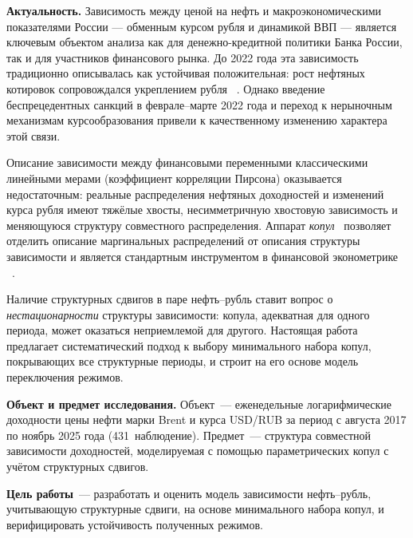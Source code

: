 



\Intro

\textbf{Актуальность.}
Зависимость между ценой на нефть и макроэкономическими показателями России ---
обменным курсом рубля и динамикой ВВП --- является ключевым объектом анализа
как для денежно-кредитной политики Банка России, так и для участников
финансового рынка.
До 2022 года эта зависимость традиционно описывалась как устойчивая
положительная: рост нефтяных котировок сопровождался укреплением рубля
~\autocite{Silvo2017}.
Однако введение беспрецедентных санкций в феврале--марте 2022 года и переход
к нерыночным механизмам курсообразования привели к качественному изменению
характера этой связи.

Описание зависимости между финансовыми переменными классическими
линейными мерами (коэффициент корреляции Пирсона) оказывается
недостаточным: реальные распределения нефтяных доходностей и изменений
курса рубля имеют тяжёлые хвосты, несимметричную хвостовую зависимость
и меняющуюся структуру совместного распределения.
Аппарат \emph{копул}~\autocite{Sklar1959, Nelsen2006} позволяет отделить
описание маргинальных распределений от описания структуры зависимости
и является стандартным инструментом в финансовой эконометрике
~\autocite{Patton2006, Rodriguez2007, Penikas2014}.

Наличие структурных сдвигов в паре нефть--рубль ставит вопрос о
\emph{нестационарности} структуры зависимости: копула, адекватная для
одного периода, может оказаться неприемлемой для другого.
Настоящая работа предлагает систематический подход к выбору минимального
набора копул, покрывающих все структурные периоды, и строит на его основе
модель переключения режимов.

\textbf{Объект и предмет исследования.}
Объект~--- еженедельные логарифмические доходности цены нефти марки Brent
и курса USD/RUB за период с августа 2017 по ноябрь 2025 года (431~наблюдение).
Предмет~--- структура совместной зависимости доходностей, моделируемая
с помощью параметрических копул с учётом структурных сдвигов.

\textbf{Цель работы}~--- разработать и оценить модель зависимости нефть--рубль,
учитывающую структурные сдвиги, на основе минимального набора копул,
и верифицировать устойчивость полученных режимов.

